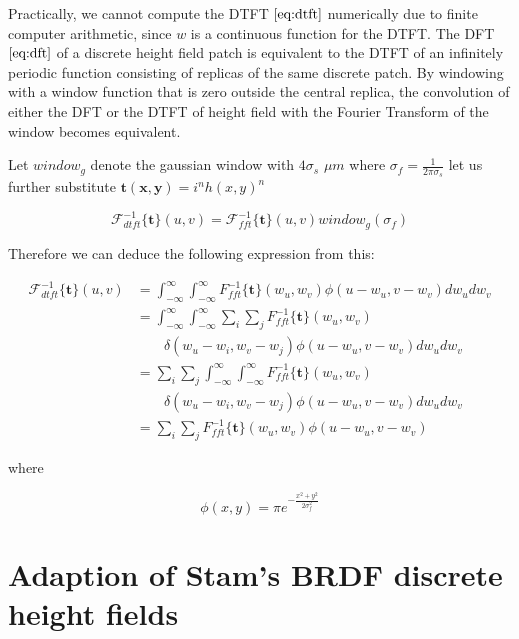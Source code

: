 Practically, we cannot compute the DTFT $\ref{eq:dtft}$ numerically due to finite computer arithmetic, since $w$ is a continuous function for the DTFT. The DFT $\ref{eq:dft}$ of a discrete height field patch is equivalent to the DTFT of an infinitely periodic function consisting of replicas of the same discrete patch. By windowing with a window function that is zero outside the central replica, the convolution of either the DFT or the DTFT of height field with the Fourier Transform of the window becomes equivalent.

Let $window_g$ denote the gaussian window with $4\sigma_s$ $\mu m$ where $\sigma_f = \frac{1}{2\pi\sigma_s}$
let us further substitute $\mathbf{t(x,y)}=i^n h(x,y)^n$

\begin{equation}
\mathcal{F}_{dtft}^{-1}\{\mathbf{t}\}(u,v) = \mathcal{F}_{fft}^{-1}\{\mathbf{t}\}(u,v)window_g(\sigma_f)
\end{equation} 

Therefore we can deduce the following expression from this:

\begin{align}
\mathcal{F}_{dtft}^{-1}\{\mathbf{t}\}(u,v)
& = \int_{-\infty}^{\infty} \int_{-\infty}^{\infty} {F}_{fft}^{-1}\{\mathbf{t}\}(w_u,w_v) \phi(u-w_u, v-w_v) dw_u dw_v \nonumber \\
& = \int_{-\infty}^{\infty} \int_{-\infty}^{\infty} \sum_i \sum_j {F}_{fft}^{-1}\{\mathbf{t}\}(w_u,w_v) \nonumber \\ 
& \quad \quad \delta(w_u-w_i, w_v-w_j)\phi(u-w_u, v-w_v) dw_u dw_v \nonumber \\
& = \sum_i \sum_j \int_{-\infty}^{\infty} \int_{-\infty}^{\infty}  {F}_{fft}^{-1}\{\mathbf{t}\}(w_u,w_v) \nonumber \\
& \quad \quad \delta(w_u-w_i, w_v-w_j)\phi(u-w_u, v-w_v) dw_u dw_v \nonumber \\
& = \sum_i \sum_j {F}_{fft}^{-1}\{\mathbf{t}\}(w_u,w_v) \phi(u-w_u, v-w_v)
\end{align}

where 

\begin{equation} \label{eq:gaussweight}
 \phi(x,y) = \pi e^{-\frac{x^2 + y^2}{2\sigma_{f}^2}}
\end{equation} 


\section{Adaption of Stam's BRDF discrete height fields}
